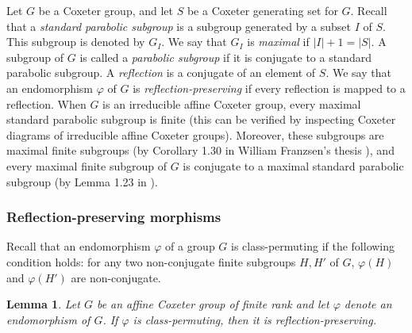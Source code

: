 \documentclass[a4paper, 11pt]{amsart}
\newtheorem{lemme}[te]{Lemma}
\theoremstyle{definition}
\newtheorem{de}[te]{Definition}
\theoremstyle{remark}
\newtheorem{rk}[te]{Remark}
\begin{document}
Let $G$ be a Coxeter group, and let $S$ be a Coxeter generating set for $G$. Recall that a \emph{standard parabolic subgroup} is a subgroup generated by a subset $I$ of $S$. This subgroup is denoted by $G_I$. We say that $G_I$ is \emph{maximal} if $\vert I\vert+1=\vert S\vert$. A subgroup of $G$ is called a \emph{parabolic subgroup} if it is conjugate to a standard parabolic subgroup. A \emph{reflection} is a conjugate of an element of $S$. We say that an endomorphism $\varphi$ of $G$ is \emph{reflection-preserving} if every reflection is mapped to a reflection. When $G$ is an irreducible affine Coxeter group, every maximal standard parabolic subgroup is finite (this can be verified by inspecting Coxeter diagrams of irreducible affine Coxeter groups). Moreover, these subgroups are maximal finite subgroups (by Corollary 1.30 in William Franzsen's thesis \cite{franz}), and every maximal finite subgroup of $G$ is conjugate to a maximal standard parabolic subgroup (by Lemma 1.23 in \cite{franz}).

\subsubsection{Reflection-preserving morphisms}



Recall that an endomorphism $\varphi$ of a group $G$ is class-permuting if the following condition holds: for any two non-conjugate finite subgroups $H,H'$ of $G$, $\varphi(H)$ and $\varphi(H')$ are non-conjugate.

\begin{lemme}\label{lemma1}
Let $G$ be an affine Coxeter group of finite rank and let $\varphi$ denote an endomorphism of $G$. If $\varphi$ is class-permuting, then it is reflection-preserving.\end{lemme}

\end{document}
